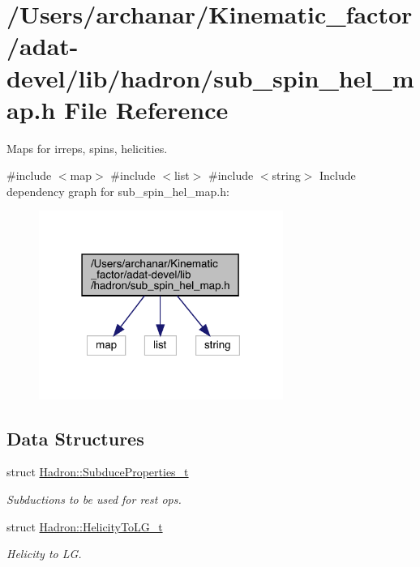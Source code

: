 \hypertarget{adat-devel_2lib_2hadron_2sub__spin__hel__map_8h}{}\section{/\+Users/archanar/\+Kinematic\+\_\+factor/adat-\/devel/lib/hadron/sub\+\_\+spin\+\_\+hel\+\_\+map.h File Reference}
\label{adat-devel_2lib_2hadron_2sub__spin__hel__map_8h}


Maps for irreps, spins, helicities.  


{\ttfamily \#include $<$map$>$}\newline
{\ttfamily \#include $<$list$>$}\newline
{\ttfamily \#include $<$string$>$}\newline
Include dependency graph for sub\+\_\+spin\+\_\+hel\+\_\+map.\+h\+:
\nopagebreak
\begin{figure}[H]
\begin{center}
\leavevmode
\includegraphics[width=226pt]{d8/d24/adat-devel_2lib_2hadron_2sub__spin__hel__map_8h__incl}
\end{center}
\end{figure}
\subsection*{Data Structures}
\begin{DoxyCompactItemize}
\item 
struct \mbox{\hyperlink{structHadron_1_1SubduceProperties__t}{Hadron\+::\+Subduce\+Properties\+\_\+t}}
\begin{DoxyCompactList}\small\item\em Subductions to be used for rest ops. \end{DoxyCompactList}\item 
struct \mbox{\hyperlink{structHadron_1_1HelicityToLG__t}{Hadron\+::\+Helicity\+To\+L\+G\+\_\+t}}
\begin{DoxyCompactList}\small\item\em Helicity to LG. \end{DoxyCompactList}\end{DoxyCompactItemize}
